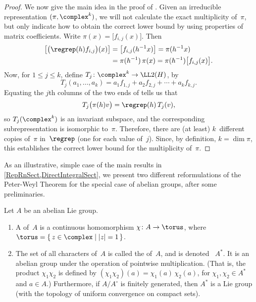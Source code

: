 \begin{proof}
We now give the main idea in the proof of .
Given an irreducible representation $(\pi, \complex^k)$, we will not calculate the exact multiplicity of~$\pi$, but only indicate how to obtain the correct lower bound by using properties of matrix coefficients. 
Write $\pi(x) = \bigl[ f_{i,j}(x) \bigr]$. Then
	\begin{align}  \label{PeterWeylMatCoeff}
	\begin{split}
	\bigl[ \bigl( \regrep(h)f_{i,j} \bigr)(x) \bigr]
	&= \bigl[ f_{i,j}(h^{-1} x) \bigr]
	= \pi(h^{-1} x)
	\\&= \pi(h^{-1}) \, \pi(x)
	= \pi(h^{-1}) \bigl[ f_{i,j}(x) \bigr] 
	. \end{split} \end{align}
Now, for $1 \le j \le k$, define $ T_j \colon \complex^k \to \LL2(H)$, by
	$$ T_j(a_1,\ldots,a_k) = a_1  f_{1,j} + a_2 f_{2,j} + \cdots + a_k f_{k,j} .$$
Equating the $j$th columns of the two ends of  tells us that
	$$ T_j \bigl( \pi(h) v \bigr) = \regrep(h) \, T_j(v) ,$$
so $T_j(\complex^k)$ is an invariant subspace, and the corresponding subrepresentation is isomorphic to~$\pi$. Therefore, there are (at least) $k$~different copies of~$\pi$ in~$\regrep$ (one for each value of~$j$). Since, by definition, $k = \dim \pi$, this establishes the correct lower bound for the multiplicity of~$\pi$.
\end{proof}



As an illustrative, simple case of the main results in \cref{RepRnSect,DirectIntegralSect}, we present two different reformulations of the Peter-Weyl Theorem for the special case of abelian groups, after some preliminaries.

\begin{defn}
Let $A$ be an abelian Lie group.
	\begin{enumerate}
	\item A  of~$A$ is a continuous homomorphism $\chi \colon A \to \torus$, where $\torus = \{\, z \in \complex \mid |z| = 1 \,\}$.
	\item The set of all characters of~$A$ is called the  of~$A$, and is denoted~%
	$A^*$.
	 It is an abelian group under the operation of pointwise multiplication. (That is, the product $\chi_1 \chi_2$ is defined by $(\chi_1 \chi_2)(a) = \chi_1(a) \, \chi_2(a)$, for $\chi_1, \chi_2 \in A^*$ and $a \in A$.) Furthermore, if $A/A^\circ$ is finitely generated, then $A^*$ is a Lie group (with the topology of uniform convergence on compact sets).
	\end{enumerate}
\end{defn}

